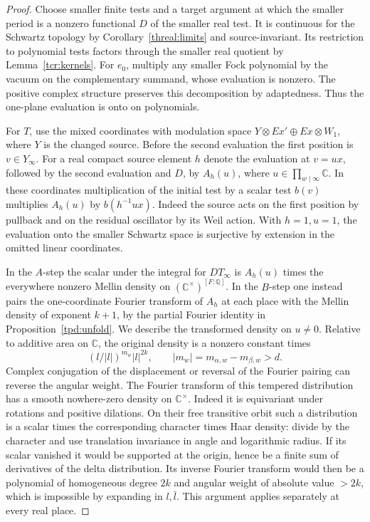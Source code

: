 \begin{proof}
Choose smaller finite tests and a target argument at which the
smaller period is a nonzero functional \(D\) of the smaller real
test. It is continuous for the Schwartz topology by
Corollary~\ref{threal:limits} and source-invariant. Its restriction
to polynomial tests factors through the smaller real quotient by
Lemma~\ref{tcr:kernels}. For \(e_0\), multiply any smaller Fock
polynomial by the vacuum on the complementary summand, whose
evaluation is nonzero. The positive complex structure preserves
this decomposition by adaptedness. Thus the one-plane evaluation
is onto on polynomials.

For \(T\), use the mixed coordinates with modulation space
\(Y\otimes Ex'\oplus Ex\otimes W_1\), where \(Y\) is the changed
source. Before the second evaluation the first position is
\(v\in Y_\infty\). For a real compact source element \(h\) denote
the evaluation at \(v=u x\), followed by the second evaluation
and \(D\), by \(A_h(u)\), where \(u\in\prod_{w\mid\infty}\mathbb C\).
In these coordinates multiplication of the initial test by a
scalar test \(b(v)\) multiplies \(A_h(u)\) by \(b(h^{-1}ux)\).
Indeed the source acts on the first position by pullback and on
the residual oscillator by its Weil action. With \(h=1,u=1\),
the evaluation onto the smaller Schwartz space is surjective
by extension in the omitted linear coordinates.

In the \(A\)-step the scalar under the integral for \(DT_\infty\)
is \(A_h(u)\) times the everywhere nonzero Mellin density on
\((\mathbb C^\times)^{[F:\mathbb Q]}\). In the \(B\)-step one
instead pairs the one-coordinate Fourier transform of \(A_h\)
at each place with the Mellin density of exponent \(k+1\), by
the partial Fourier identity in Proposition~\ref{tpd:unfold}.
We describe the transformed density on \(u\ne0\). Relative to
additive area on \(\mathbb C\), the original density is a nonzero
constant times
\[
          (l/|l|)^{m_w}|l|^{2k},\qquad |m_w|=m_{\alpha,w}-m_{\beta,w}>d .
\]
Complex conjugation of the displacement or reversal of the Fourier
pairing can reverse the angular weight. The Fourier transform of
this tempered distribution has a smooth nowhere-zero density on
\(\mathbb C^\times\). Indeed it is equivariant under rotations and
positive dilations. On their free transitive orbit such a distribution
is a scalar times the corresponding character times Haar density:
divide by the character and use translation invariance in angle and
logarithmic radius. If its scalar vanished it would be supported
at the origin, hence be a finite sum of derivatives of the delta
distribution. Its inverse Fourier transform would then be a
polynomial of homogeneous degree \(2k\) and angular weight of
absolute value \(>2k\), which is impossible by expanding in
\(l,\bar l\). This argument applies separately at every real place.


\end{proof}

